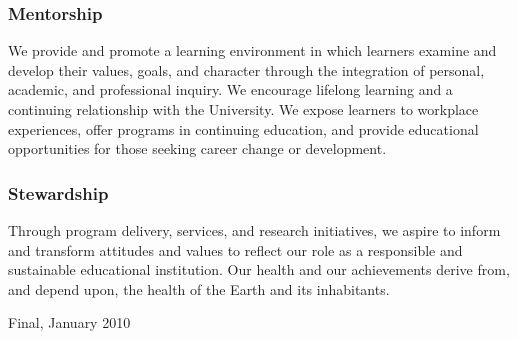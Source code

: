 \documentclass[10pt,DIVcalc,oneside,letterpaper,headexclude]{scrreprt}
\begin{document}
\begin{multicols}{2}
\subsubsection{\color{Maroon}Mentorship}
We provide and promote a learning environment in which learners examine and develop their values, goals, and character through the integration of personal, academic, and professional inquiry. We encourage lifelong learning and a continuing relationship with the University. We expose learners to workplace experiences, offer programs in continuing education, and provide  educational opportunities for those seeking career change or development. 


\subsubsection{\color{Maroon}Stewardship}
Through program delivery, services, and research initiatives, we aspire to inform and transform attitudes and values to reflect our role as a responsible and sustainable educational institution. Our health and our achievements derive from, and depend upon, the health of the Earth and its inhabitants.

\vspace{1cm}
\noindent
\textsf{Final, January 2010}

\end{multicols}
\end{document}
